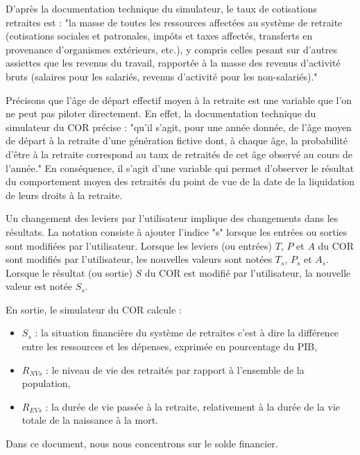 \documentclass[10pt]{article}
\begin{document}
D'après la documentation technique du simulateur, 
le taux de cotisations retraites est : "la masse de toutes les ressources affectées au système
de retraite (cotisations sociales et patronales, impôts et taxes affectés, transferts en provenance
d’organismes extérieurs, etc.), y compris celles pesant sur d’autres assiettes 
que les revenus du travail, rapportée à la masse des revenus d'activité bruts (salaires pour les salariés, revenus d’activité pour les non-salariés)." 

Précisons que l'âge de départ effectif moyen à la retraite est une variable que l'on ne peut pas 
piloter directement. 
En effet, la documentation technique du simulateur du COR précise : "qu'il s’agit, 
pour une année donnée, de l’âge moyen 
de départ à la retraite d’une génération fictive dont, à chaque âge, 
la probabilité d’être à la retraite correspond au taux de retraités de cet âge observé 
au cours de l’année." 
En conséquence, il s'agit d'une variable qui permet d'observer le résultat du comportement 
moyen des retraités du point de vue de la date de la liquidation de leurs droits à la 
retraite. 

Un changement des leviers par l'utilisateur implique des changements 
dans les résultats. 
La notation consiste à ajouter l'indice "s" lorsque les entrées ou sorties 
sont modifiées par l'utilisateur. 
Lorsque les leviers (ou entrées) $T$, $P$ et $A$ du COR sont modifiés par l'utilisateur, les nouvelles valeurs sont notées $T_s$, $P_s$ et $A_s$. 
Lorsque le résultat (ou sortie) $S$ du COR est modifié par l'utilisateur, 
la nouvelle valeur est notée $S_s$.

En sortie, le simulateur du COR calcule :
\begin{itemize}
\item $S_s$ : la situation financière du système de retraites c'est à dire la différence 
entre les ressources et les dépenses, exprimée en pourcentage du PIB, 
\item $R_{NVs}$ : le niveau de vie des retraités par rapport à l’ensemble de la population, 
\item $R_{EVs}$ : la durée de vie passée à la retraite, relativement à la durée de la vie totale 
de la naissance à la mort. 
\end{itemize}
Dans ce document, nous nous concentrons sur le solde financier. 

\end{document}
